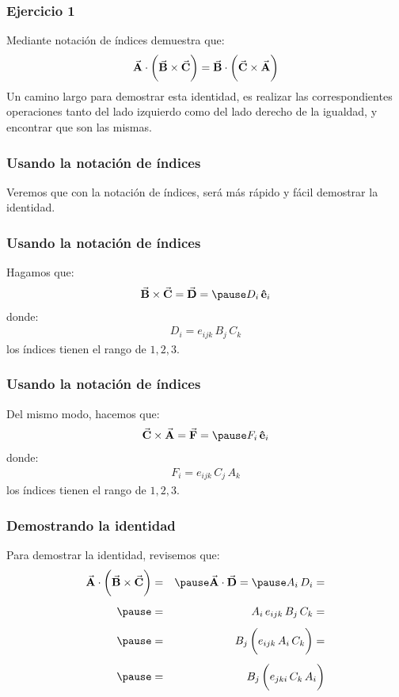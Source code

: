 \documentclass[12pt]{beamer}
\begin{document}
\begin{frame}
\frametitle{Ejercicio 1}
Mediante notación de índices demuestra que:
\begin{align*}
\va{A} \cdot \bigg( \va{B} \times \va{C} \bigg) = \va{B} \cdot \bigg( \va{C} \times \va{A} \bigg)
\end{align*}
\pause
Un camino largo para demostrar esta identidad, es realizar las correspondientes operaciones tanto del lado izquierdo como del lado derecho de la igualdad, y encontrar que son las mismas.
\end{frame}
\begin{frame}
\frametitle{Usando la notación de índices}
Veremos que con la notación de índices, será más rápido y fácil demostrar la identidad.
\end{frame}
\begin{frame}
\frametitle{Usando la notación de índices}
Hagamos que:
\begin{eqnarray*}
\va{B} \times \va{C} = \va{D} = \pause D_{i} \, \vu{e}_{i}
\end{eqnarray*}
\pause
donde:
\begin{align*}
D_{i} = e_{ijk} \, B_{j} \, C_{k}
\end{align*}
los índices tienen el rango de $1, 2, 3$.
\end{frame}
\begin{frame}
\frametitle{Usando la notación de índices}
Del mismo modo, hacemos que:
\begin{eqnarray*}
\va{C} \times \va{A} = \va{F} = \pause F_{i} \, \vu{e}_{i}
\end{eqnarray*}
\pause
donde:
\begin{align*}
F_{i} = e_{ijk} \, C_{j} \, A_{k}
\end{align*}
los índices tienen el rango de $1, 2, 3$.
\end{frame}
\begin{frame}
\frametitle{Demostrando la identidad}
Para demostrar la identidad, revisemos que:
\begin{eqnarray*}
\va{A} \cdot \bigg( \va{B} \times \va{C} \bigg) &=& \pause \va{A} \cdot \va{D} = \pause A_{i} \, D_{i} = \\[0.45em] \pause
&=& A_{i} \, e_{ijk} \, B_{j} \, C_{k} = \\[0.45em] \pause
&=& B_{j} \, \bigg( e_{ijk} \, A_{i} \, C_{k} \bigg) = \\[0.45em] \pause
&=& B_{j} \, \bigg( e_{jki} \, C_{k} \, A_{i} \bigg)
\end{eqnarray*}
\pause
{}
\end{frame}
\end{document}
